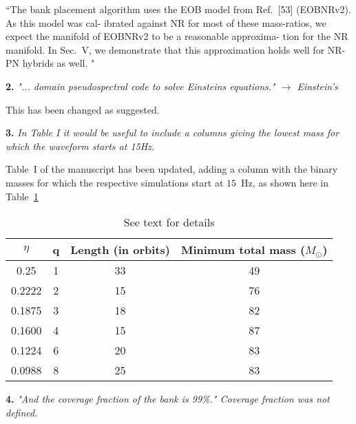 \documentclass[a4paper,12pt]{article}
\begin{document}
\vspace{5pt}
``The bank placement algorithm uses the EOB
model from Ref.~[53] (EOBNRv2). As this model was cal-
ibrated against NR for most of these mass-ratios, we expect
the manifold of EOBNRv2 to be a reasonable approxima-
tion for the NR manifold. In Sec.~V, we demonstrate that
this approximation holds well for NR-PN hybrids as well. "
\vspace{8pt}

{\bf 2.} \textit{"... domain pseudospectral code to solve Einsteins equations." $\rightarrow$ Einstein's}
\vspace{8pt}

This has been changed as suggested.
\vspace{12pt}

{\bf 3.} \textit{In Table I it would be useful to include a columns giving the
lowest mass for which the waveform starts at 15Hz.}
\vspace{8pt}

Table~I of the manuscript has been updated, adding a column with the 
binary masses for which the respective simulations start at $15$~Hz, 
as shown here in Table~\ref{tableNR}
\begin{table}
\centering
\begin{tabular}{| c | c | c | c |}
\hline
$\hspace{10pt}\eta\hspace{10pt}$ & \hspace{15pt} q\hspace{15pt} & Length (in orbits) & Minimum total mass ($M_\odot$)\\ \hline
0.25 & 1 & 33 & 49 \\
0.2222 & 2 & 15 & 76 \\
0.1875 & 3 & 18 & 82 \\
0.1600 & 4 & 15 & 87 \\
0.1224 & 6 & 20 & 83 \\
0.0988 & 8 & 25 & 83 \\
\hline
\end{tabular}
\caption{See text for details}
\label{tableNR}
\end{table}

\vspace{12pt}

{\bf 4.} \textit{"And the coverage fraction of the bank is 99\%." Coverage fraction
was not defined.}
\vspace{8pt}
\end{document}
